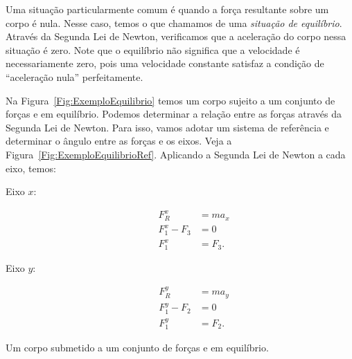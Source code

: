 Uma situação particularmente comum é quando a força resultante sobre um corpo é nula. Nesse caso, temos o que chamamos de uma \emph{situação de equilíbrio}. Através da Segunda Lei de Newton, verificamos que a aceleração do corpo nessa situação é zero. Note que o equilíbrio não significa que a velocidade é necessariamente zero, pois uma velocidade constante satisfaz a condição de ``aceleração nula'' perfeitamente.

Na Figura~\ref{Fig:ExemploEquilibrio} temos um corpo sujeito a um conjunto de forças e em equilíbrio. Podemos determinar a relação entre as forças através da Segunda Lei de Newton. Para isso, vamos adotar um sistema de referência e determinar o ângulo entre as forças e os eixos. Veja a Figura~\ref{Fig:ExemploEquilibrioRef}. Aplicando a Segunda Lei de Newton a cada eixo, temos:
\begin{description}
    \item[Eixo $x$:]
        \begin{align}
            F_R^x &= m a_x \\
            F_1^x - F_3 &= 0 \\
            F_1^x &= F_3.
        \end{align}
    \item[Eixo $y$:]
        \begin{align}
            F_R^y &= m a_y \\
            F_1^y - F_2 &= 0 \\
            F_1^y &= F_2.
        \end{align}
\end{description}

\begin{marginfigure}[-5cm]
\centering
{}
\caption{Um corpo submetido a um conjunto de forças e em equilíbrio.\label{Fig:ExemploEquilibrioRef}}
\end{marginfigure}

